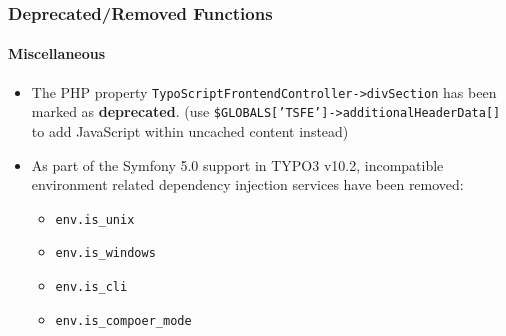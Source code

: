 \begin{frame}[fragile]
	\frametitle{Deprecated/Removed Functions}
	\framesubtitle{Miscellaneous}

	\lstset{basicstyle=\tiny\ttfamily}

	\begin{itemize}

		\item The PHP property \texttt{TypoScriptFrontendController->divSection} has been marked as \textbf{deprecated}.\newline
			\smaller
				(use \texttt{\$GLOBALS['TSFE']->additionalHeaderData[]} to add JavaScript within uncached content instead)
			\normalsize

		\item As part of the Symfony 5.0 support in TYPO3 v10.2, incompatible environment related dependency injection services have been removed:

			\begin{itemize}
				\item \texttt{env.is\_unix}
				\item \texttt{env.is\_windows}
				\item \texttt{env.is\_cli}
				\item \texttt{env.is\_compoer\_mode}
			\end{itemize}

	\end{itemize}

\end{frame}

